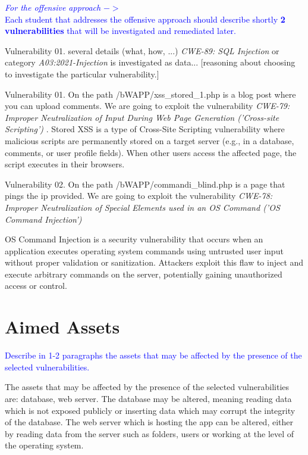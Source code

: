 \documentclass{article}
\begin{document}
\textcolor{blue}{\textit{For the offensive approach} $->$\\
    Each student that addresses the offensive approach should describe shortly \textbf{2 vulnerabilities} that will be investigated and remediated later.
}

Vulnerability 01. several details (what, how, ...) \textit{CWE-89: SQL Injection} or category \textit{A03:2021-Injection}  \cite{Vuln001} is investigated as data... [reasoning about choosing to investigate the particular vulnerability.]

Vulnerability 01. On the path /bWAPP/xss\_stored\_1.php is a blog post where you can upload comments.
We are going to exploit the vulnerability \textit{CWE-79: Improper Neutralization of Input During Web Page Generation ('Cross-site Scripting')} \cite{vul:xss}.
Stored XSS is a type of Cross-Site Scripting vulnerability where malicious scripts are permanently stored on a target server (e.g., in a database, comments, or user profile fields). When other users access the affected page, the script executes in their browsers.

Vulnerability 02. On the path /bWAPP/commandi\_blind.php is a page that pings the ip provided.
We are going to exploit the vulnerability \textit{CWE-78: Improper Neutralization of Special Elements used in an OS Command ('OS Command Injection')} \cite{vul:command-injection}

OS Command Injection is a security vulnerability that occurs when an application executes operating system commands using untrusted user input without proper validation or sanitization. Attackers exploit this flaw to inject and execute arbitrary commands on the server, potentially gaining unauthorized access or control.

\section{Aimed Assets}
\label{}

\textcolor{blue}{Describe in 1-2 paragraphs the assets that may be affected by the presence of the selected vulnerabilities.
}
\par The assets that may be affected by the presence of the selected vulnerabilities are: database, web server. The database may be altered, meaning reading data which is not exposed publicly or inserting data which may corrupt the integrity of the database. The web server which is hosting the app can be altered, either by reading data from the server such as folders, users or working at the level of the operating system.
\end{document}
